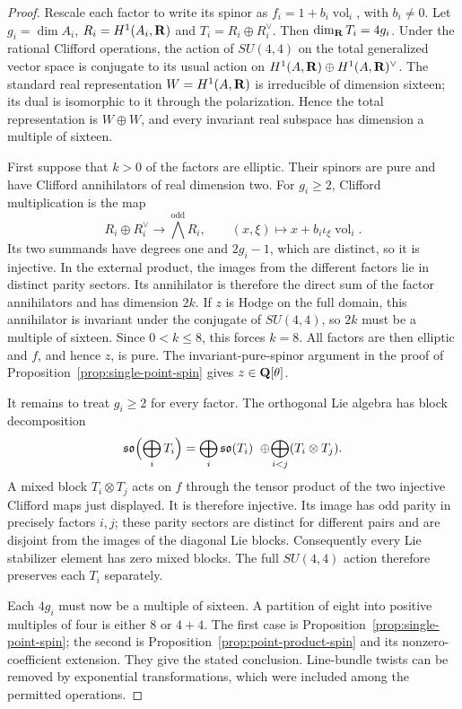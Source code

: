 \begin{proof}
Rescale each factor to write its spinor as
$f_i=1+b_i\operatorname{vol}_i$, with $b_i\ne0$.
Let $g_i=\dim A_i$, $R_i=H^1(A_i,\mathbf R)$ and
$T_i=R_i\oplus R_i^\vee$. Then $\dim_\mathbf R T_i=4g_i$.
Under the rational Clifford operations, the action of $SU(4,4)$ on
the total generalized vector space is conjugate to its usual action
on $H^1(A,\mathbf R)\oplus H^1(A,\mathbf R)^\vee$. The standard real
representation $W=H^1(A,\mathbf R)$ is irreducible of dimension sixteen;
its dual is isomorphic to it through the polarization. Hence the
total representation is $W\oplus W$, and every invariant real
subspace has dimension a multiple of sixteen.

First suppose that $k>0$ of the factors are elliptic. Their spinors
are pure and have Clifford annihilators of real dimension two.
For $g_i\ge2$, Clifford multiplication is the map
\[
 R_i\oplus R_i^\vee\longrightarrow\bigwedge^{\mathrm{odd}}R_i,
 \qquad(x,\xi)\longmapsto x+b_i\iota_\xi\operatorname{vol}_i.
\]
Its two summands have degrees one and $2g_i-1$, which are distinct,
so it is injective. In the external product, the images from the
different factors lie in distinct parity sectors. Its annihilator
is therefore the direct sum of the factor annihilators and has
dimension $2k$. If $z$ is Hodge on the full domain, this annihilator
is invariant under the conjugate of $SU(4,4)$, so $2k$ must be a
multiple of sixteen. Since $0<k\le8$, this forces $k=8$.
All factors are then elliptic and $f$, and hence $z$, is pure.
The invariant-pure-spinor argument in the proof of
Proposition~\ref{prop:single-point-spin} gives $z\in\mathbf Q[\theta]$.

It remains to treat $g_i\ge2$ for every factor. The orthogonal Lie
algebra has block decomposition
\[
 \mathfrak{so}\Bigl(\bigoplus_iT_i\Bigr)
 =\bigoplus_i\mathfrak{so}(T_i)
  \ \oplus\!\bigoplus_{i<j}(T_i\otimes T_j).
\]
A mixed block $T_i\otimes T_j$ acts on $f$ through the tensor product
of the two injective Clifford maps just displayed. It is therefore
injective. Its image has odd parity in precisely factors $i,j$;
these parity sectors are distinct for different pairs and are
disjoint from the images of the diagonal Lie blocks. Consequently
every Lie stabilizer element has zero mixed blocks. The full
$SU(4,4)$ action therefore preserves each $T_i$ separately.

Each $4g_i$ must now be a multiple of sixteen. A partition of eight
into positive multiples of four is either $8$ or $4+4$.
The first case is Proposition~\ref{prop:single-point-spin}; the
second is Proposition~\ref{prop:point-product-spin} and its
nonzero-coefficient extension. They give the stated conclusion.
Line-bundle twists can be removed by exponential transformations,
which were included among the permitted operations.
\end{proof}

